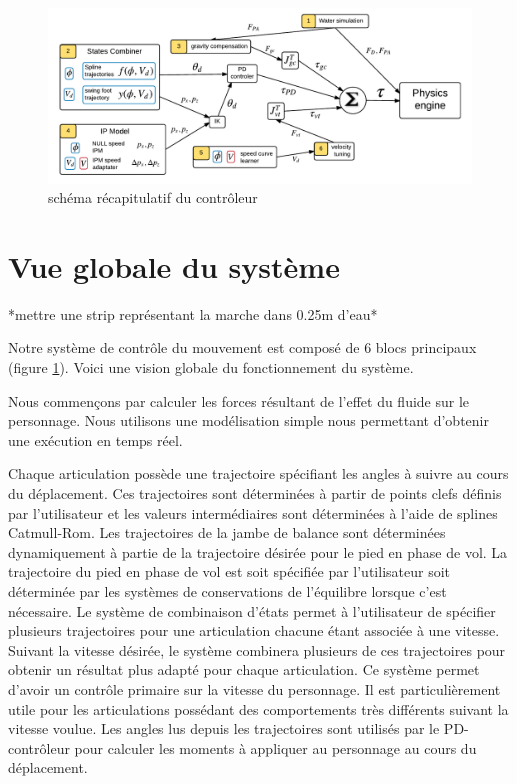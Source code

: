 \documentclass{llncs}
\begin{document}
\begin{figure}[h]
\centering
\includegraphics[scale=0.6]{general_process.pdf}
\caption{schéma récapitulatif du contrôleur}
\label{fig:shema_controler}
\end{figure}

\section{Vue globale du système}
%

*mettre une strip représentant la marche dans 0.25m d'eau*

Notre système de contrôle du mouvement est composé de 6 blocs principaux (figure \ref{fig:shema_controler}). Voici une vision globale du fonctionnement du système. 

Nous commençons par calculer les forces résultant de l'effet du fluide sur le personnage. Nous utilisons une modélisation simple nous permettant d'obtenir une exécution en temps réel.

Chaque articulation possède une trajectoire spécifiant les angles à suivre au cours du déplacement. Ces trajectoires sont déterminées à partir de points clefs définis par l'utilisateur et les valeurs intermédiaires sont déterminées à l'aide de splines Catmull-Rom. Les trajectoires de la jambe de balance sont déterminées dynamiquement à partie de la trajectoire désirée pour le pied en phase de vol. La trajectoire du pied en phase de vol est soit spécifiée par l'utilisateur soit déterminée par les systèmes de conservations de l'équilibre lorsque c'est nécessaire. Le système de combinaison d'états permet à l'utilisateur de spécifier plusieurs trajectoires pour une articulation chacune étant associée à une vitesse. Suivant la vitesse désirée, le système combinera plusieurs de ces trajectoires pour obtenir un résultat plus adapté pour chaque articulation. Ce système permet d'avoir un contrôle primaire sur la vitesse du personnage. Il est particulièrement utile pour les articulations possédant des comportements très différents suivant la vitesse voulue. Les angles lus depuis les trajectoires sont utilisés par le PD-contrôleur pour calculer les moments à appliquer au personnage au cours du déplacement.
\end{document}
